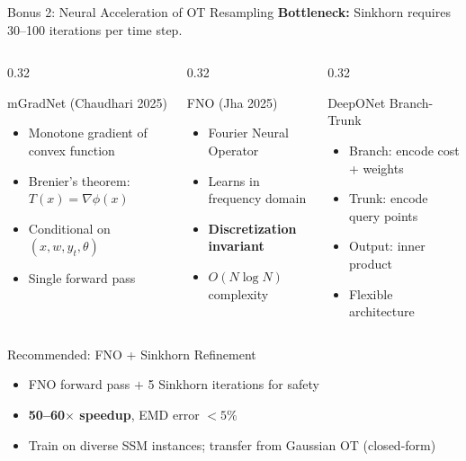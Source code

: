 \documentclass[aspectratio=169,10pt]{beamer}
\newcommand{\highlight}[1]{\textcolor{jpmlightblue}{\textbf{#1}}}
\begin{document}
\begin{frame}{Bonus 2: Neural Acceleration of OT Resampling}
\textbf{Bottleneck:} Sinkhorn requires 30--100 iterations per time step.

\vspace{0.3em}
\begin{columns}[T]
\begin{column}{0.32\textwidth}
\begin{block}{\centering mGradNet}
{\scriptsize (Chaudhari 2025)}
\begin{itemize}\scriptsize
  \item Monotone gradient of convex function
  \item Brenier's theorem: $T(x) = \nabla\phi(x)$
  \item Conditional on $(x, w, y_t, \theta)$
  \item Single forward pass
\end{itemize}
\end{block}
\end{column}
\begin{column}{0.32\textwidth}
\begin{block}{\centering FNO}
{\scriptsize (Jha 2025)}
\begin{itemize}\scriptsize
  \item Fourier Neural Operator
  \item Learns in frequency domain
  \item \highlight{Discretization invariant}
  \item $O(N \log N)$ complexity
\end{itemize}
\end{block}
\end{column}
\begin{column}{0.32\textwidth}
\begin{block}{\centering DeepONet}
{\scriptsize Branch-Trunk}
\begin{itemize}\scriptsize
  \item Branch: encode cost + weights
  \item Trunk: encode query points
  \item Output: inner product
  \item Flexible architecture
\end{itemize}
\end{block}
\end{column}
\end{columns}

\vspace{0.5em}
\begin{exampleblock}{Recommended: FNO + Sinkhorn Refinement}
\begin{itemize}
  \item FNO forward pass $+$ 5 Sinkhorn iterations for safety
  \item \highlight{50--60$\times$ speedup}, EMD error $< 5\%$
  \item Train on diverse SSM instances; transfer from Gaussian OT (closed-form)
\end{itemize}
\end{exampleblock}
\end{frame}
\end{document}
